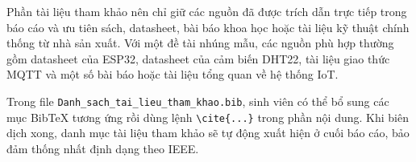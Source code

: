 \documentclass[../BTL_PTIT.tex]{subfiles}
\begin{document}
Phần tài liệu tham khảo nên chỉ giữ các nguồn đã được trích dẫn trực tiếp trong báo cáo và ưu tiên sách, datasheet, bài báo khoa học hoặc tài liệu kỹ thuật chính thống từ nhà sản xuất. Với một đề tài nhúng mẫu, các nguồn phù hợp thường gồm datasheet của ESP32, datasheet của cảm biến DHT22, tài liệu giao thức MQTT và một số bài báo hoặc tài liệu tổng quan về hệ thống IoT.

Trong file \texttt{Danh\_sach\_tai\_lieu\_tham\_khao.bib}, sinh viên có thể bổ sung các mục BibTeX tương ứng rồi dùng lệnh \texttt{\textbackslash cite\{...\}} trong phần nội dung. Khi biên dịch xong, danh mục tài liệu tham khảo sẽ tự động xuất hiện ở cuối báo cáo, bảo đảm thống nhất định dạng theo IEEE.
\end{document}
